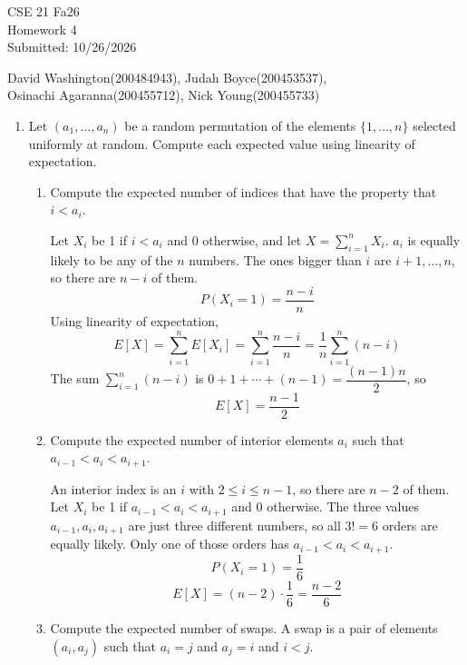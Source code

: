 \documentclass{article}
\begin{document}
\begin{flushright}
CSE 21 Fa26\\
Homework 4\\
Submitted: 10/26/2026
\end{flushright}

\begin{center}
David Washington(200484943), Judah Boyce(200453537),\\
Osinachi Agaranna(200455712), Nick Young(200455733)
\end{center}

\begin{enumerate}
    \item Let $(a_1, \ldots, a_n)$ be a random permutation of the elements $\{1, \ldots, n\}$ selected uniformly at random. Compute each expected value using linearity of expectation.

    \begin{enumerate}
        \item Compute the expected number of indices that have the property that $i < a_i$.

        Let $X_i$ be 1 if $i < a_i$ and 0 otherwise, and let $X = \sum_{i=1}^{n} X_i$.
        $a_i$ is equally likely to be any of the $n$ numbers. The ones bigger than $i$ are $i+1, \ldots, n$, so there are $n-i$ of them.
        \[
        P(X_i = 1) = \frac{n-i}{n}
        \]
        Using linearity of expectation,
        \[
        E[X] = \sum_{i=1}^{n} E[X_i] = \sum_{i=1}^{n} \frac{n-i}{n} = \frac{1}{n}\sum_{i=1}^{n}(n-i)
        \]
        The sum $\sum_{i=1}^{n}(n-i)$ is $0 + 1 + \cdots + (n-1) = \dfrac{(n-1)n}{2}$, so
        \[
        \boxed{E[X] = \dfrac{n-1}{2}}
        \]

        \item Compute the expected number of interior elements $a_i$ such that $a_{i-1} < a_i < a_{i+1}$.

        An interior index is an $i$ with $2 \le i \le n-1$, so there are $n-2$ of them.
        Let $X_i$ be 1 if $a_{i-1} < a_i < a_{i+1}$ and 0 otherwise.
        The three values $a_{i-1}, a_i, a_{i+1}$ are just three different numbers, so all $3! = 6$ orders are equally likely. Only one of those orders has $a_{i-1} < a_i < a_{i+1}$.
        \[
        P(X_i = 1) = \frac{1}{6}
        \]
        \[
        \boxed{E[X] = (n-2)\cdot\frac{1}{6} = \frac{n-2}{6}}
        \]

        \item Compute the expected number of swaps. A swap is a pair of elements $(a_i, a_j)$ such that $a_i = j$ and $a_j = i$ and $i < j$.


\end{enumerate}
\end{enumerate}
\end{document}
